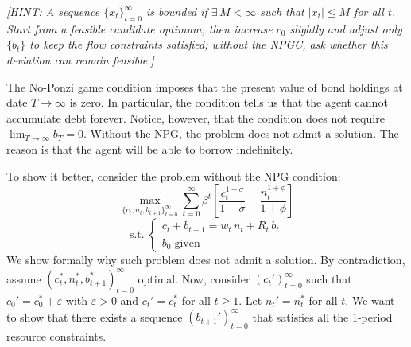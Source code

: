 \documentclass[dvipsnames,11pt]{article}
\begin{document}
\begin{enumerate}
            \textit{[HINT: A sequence $\{x_t\}_{t=0}^\infty$ is bounded if $\exists\, M<\infty$ such that $|x_t|\le M$ for all $t$. Start from a feasible candidate optimum, then increase $c_0$ slightly and adjust only $\{b_t\}$ to keep the flow constraints satisfied; without the NPGC, ask whether this deviation can remain feasible.]}

            \begin{solution}

                The No-Ponzi game condition imposes that the present value of bond holdings at date $T\to \infty$ is zero. In particular, the condition tells us that the agent cannot accumulate debt forever. Notice, however, that the condition does not require $\lim_{T\to \infty} b_T=0$. 
                Without the NPG, the problem does not admit a solution. The reason is that the agent will be able to borrow indefinitely. 

To show it better, consider the problem without the NPG condition:
$$ \max_{\{c_t,n_t,b_{t+1}\}_{t=0}^{\infty}} \sum_{t=0}^\infty \beta^t\left[\frac{c_t^{1-\sigma}}{1-\sigma} - \frac{n_t^{1+\phi}}{1+\phi}\right] $$
        $$
        \mathrm{s.t.}\;
        \begin{cases}
        c_t + b_{t+1} = w_t\,n_t + R_{t}\,b_t
        \\
        b_0 \;\text{given}
        \end{cases}
        $$ 
   We show formally why such problem does not admit a solution. By contradiction, assume $(c_t^*,n_t^*,b_{t+1}^*)_{t=0}^\infty$ optimal. Now, consider $(c_t')_{t=0}^\infty$ such that $c_0'=c_0^*+\varepsilon$ with $\varepsilon>0$ and $c_t'=c_t^*$ for all $t\geq 1$. Let $n_t'=n_t^*$ for all $t$. We want to show that there exists a sequence $(b_{t+1}')_{t=0}^\infty $ that satisfies all the 1-period resource constraints. 


\end{solution}
\end{enumerate}
\end{document}
